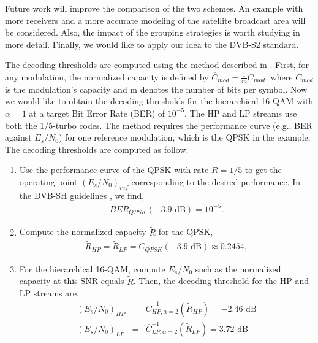 \documentclass[conference, letterpaper]{IEEEtran}
\begin{document}
Future work will improve the comparison of the two schemes. An example with more receivers and a more accurate modeling of the satellite broadcast area will be considered. Also, the impact of the grouping strategies is worth studying in more detail. Finally, we would like to apply our idea to the DVB-S2 standard.
 




















The decoding thresholds are computed using the method described in \cite{wts}. First, for any modulation, the normalized capacity is defined by $\overline{C}_{mod} = \frac{1}{m} C_{mod}$, where  $C_{mod}$ is the modulation's capacity and m denotes the number of bits per symbol. Now we would like to obtain the decoding thresholds for the hierarchical 16-QAM with $\alpha=1$ at a target Bit Error Rate (BER) of $10^{-5}$. The HP and LP streams use both the 1/5-turbo codes. The method requires the performance curve (e.g., BER against $E_s/N_0$) for one reference modulation, which is the QPSK in the example. The decoding thresholds are computed as follow:
\begin{enumerate}

\item Use the performance curve of the QPSK with rate $R=1/5$ to get the operating point $\left(E_s/N_0\right)_{ref}$ corresponding to the desired performance. In the DVB-SH guidelines \cite[Table 7.5]{sh}, we find,
\begin{eqnarray*}
BER_{QPSK} \left( -3.9 \mbox{ dB} \right) = 10^{-5}.
\end{eqnarray*}

\item Compute the normalized capacity $\tilde R$ for the QPSK,
\begin{eqnarray*}
\tilde R_{HP} = \tilde R_{LP} = \overline{C}_{QPSK} \left( -3.9 \mbox{ dB} \right) \approx 0.2454,
\end{eqnarray*}


\item For the hierarchical 16-QAM, compute $E_s/N_0$ such as the normalized capacity at this SNR equals $\tilde R$. Then, the decoding threshold for the HP and LP streams are,
\begin{eqnarray*}
\left( E_s/N_0 \right)_{HP} &=& \overline{C}_{HP,\alpha=2}^{-1} \left( \tilde R_{HP} \right) = -2.46 \mbox{ dB}\\
\left( E_s/N_0 \right)_{LP} &=& \overline{C}_{LP,\alpha=2}^{-1} \left( \tilde R_{LP} \right) = 3.72 \mbox{ dB}
\end{eqnarray*}
\end{enumerate}
 












\nocite{*}


\end{document}

